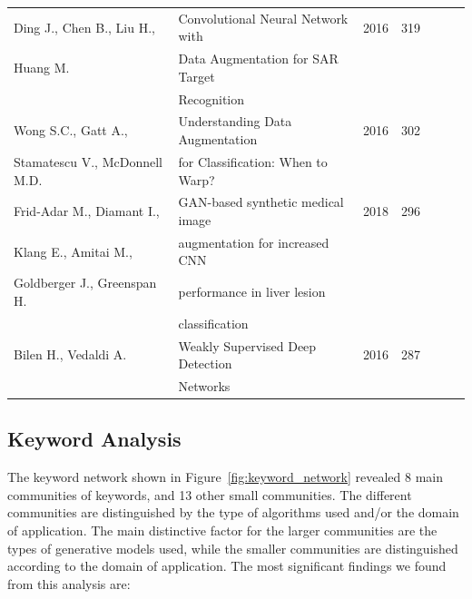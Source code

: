 \documentclass[pdflatex,sn-mathphys]{sn-jnl}%
\theoremstyle{thmstyleone}
\theoremstyle{thmstyletwo}
\theoremstyle{thmstylethree}
\begin{document}
\begin{table}[ht]
\begin{center}
\begin{tabular*}{\textwidth}{@{\extracolsep{\fill}}lllllll@{\extracolsep{\fill}}}
        Ding J., Chen B., Liu H., & Convolutional Neural Network with & 2016 & 319 \\
        Huang M.                  & Data Augmentation for SAR Target && \\
        \vspace{.2cm}             & Recognition \\

        Wong S.C., Gatt A., & Understanding Data Augmentation & 2016 & 302 \\
        \vspace{.2cm}Stamatescu V., McDonnell M.D. & for Classification: When to Warp? && \\

        Frid-Adar M., Diamant I., & GAN-based synthetic medical image & 2018 & 296 \\
        Klang E., Amitai M., & augmentation for increased CNN && \\
        Goldberger J., Greenspan H. & performance in liver lesion && \\
        \vspace{.2cm}               & classification \\

        Bilen H., Vedaldi A. & Weakly Supervised Deep Detection & 2016 & 287 \\
        \vspace{.2cm}        & Networks \\

        \bottomrule
    \end{tabular*}
    \end{center}
\end{table}

\subsection{Keyword Analysis}

The keyword network shown in Figure~\ref{fig:keyword_network} revealed 8 main
communities of keywords, and 13 other small communities. The different
communities are distinguished by the type of algorithms used and/or the domain
of application. The main distinctive factor for the larger communities are the
types of generative models used, while the smaller communities are
distinguished according to the domain of application. The most significant
findings we found from this analysis are:
\end{document}
